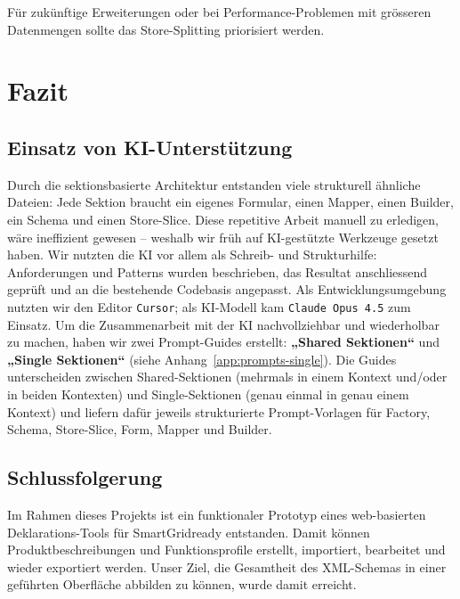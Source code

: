 \documentclass[a4paper,12pt]{article}
\newcommand{\code}[1]{\texttt{#1}}
\begin{document}
\noindent Für zukünftige Erweiterungen oder bei Performance-Problemen mit grösseren Datenmengen sollte 
das Store-Splitting priorisiert werden.

\newpage

\section{Fazit}

\subsection{Einsatz von KI-Unterstützung}

Durch die sektionsbasierte Architektur entstanden viele strukturell ähnliche Dateien: 
Jede Sektion braucht ein eigenes Formular, einen Mapper, einen Builder, ein Schema und einen Store-Slice. 
Diese repetitive Arbeit manuell zu erledigen, wäre ineffizient gewesen – weshalb wir früh auf KI-gestützte Werkzeuge gesetzt haben.
Wir nutzten die KI vor allem als Schreib- und Strukturhilfe: Anforderungen und Patterns wurden beschrieben,
das Resultat anschliessend geprüft und an die bestehende Codebasis angepasst. Als Entwicklungsumgebung nutzten wir den Editor
\code{Cursor}; als KI-Modell kam \code{Claude Opus 4.5} zum Einsatz.
\newline
Um die Zusammenarbeit mit der KI nachvollziehbar und wiederholbar zu machen, haben wir zwei Prompt-Guides erstellt:
\textbf{„Shared Sektionen“} und \textbf{„Single Sektionen“}
(siehe Anhang~\ref{app:prompts-single}). Die Guides unterscheiden
zwischen Shared-Sektionen (mehrmals in einem Kontext und/oder in beiden Kontexten) und Single-Sektionen (genau einmal in genau einem Kontext)
und liefern dafür jeweils strukturierte Prompt-Vorlagen
für Factory, Schema, Store-Slice, Form, Mapper und Builder.


\subsection{Schlussfolgerung}

Im Rahmen dieses Projekts ist ein funktionaler Prototyp eines web-basierten Deklarations-Tools für SmartGridready 
entstanden. Damit können Produktbeschreibungen und Funktionsprofile erstellt, importiert, bearbeitet und wieder 
exportiert werden. Unser Ziel, die Gesamtheit des XML-Schemas in einer geführten Oberfläche abbilden zu können, 
wurde damit erreicht.
\end{document}
